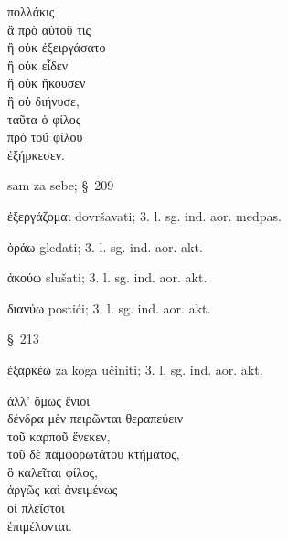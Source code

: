 
{\large
\begin{greek}
\noindent πολλάκις \\
\tabto{2em} ἃ πρὸ αὑτοῦ τις \\
\tabto{4em} ἢ οὐκ ἐξειργάσατο \\
\tabto{4em} ἢ οὐκ εἶδεν \\
\tabto{4em} ἢ οὐκ ἤκουσεν \\
\tabto{4em} ἢ οὐ διήνυσε, \\
\tabto{2em} ταῦτα ὁ φίλος \\
\tabto{4em} πρὸ τοῦ φίλου \\
\tabto{2em} ἐξήρκεσεν.\\

\end{greek}
}

\begin{description}[noitemsep]
\item[πρὸ αὑτοῦ] sam za sebe; §~209
\item[ἐξειργάσατο] ἐξεργάζομαι dovršavati; 3. l. sg. ind. aor. medpas.
\item[εἶδεν] ὁράω gledati; 3. l. sg. ind. aor. akt. 
\item[ἤκουσεν] ἀκούω slušati; 3. l. sg. ind. aor. akt.
\item[διήνυσε] διανύω postići; 3. l. sg. ind. aor. akt.
\item[ταῦτα] §~213
\item[ἐξήρκεσεν] ἐξαρκέω za koga učiniti; 3. l. sg. ind. aor. akt.

\end{description}



{\large
\begin{greek}
\noindent ἀλλ' ὅμως ἔνιοι \\
\tabto{2em} δένδρα μὲν πειρῶνται θεραπεύειν \\
\tabto{4em} τοῦ καρποῦ ἕνεκεν,\\
\tabto{2em} τοῦ δὲ παμφορωτάτου κτήματος, \\
\tabto{4em} ὃ καλεῖται φίλος, \\
ἀργῶς καὶ ἀνειμένως \\
οἱ πλεῖστοι \\
ἐπιμέλονται.\\

\end{greek}
}

